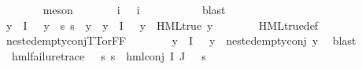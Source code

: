 \begin{isabellebody}
\ \ \ \ \ \ \isamarkupfalse%
\ meson\isanewline
\ \ \ \ \isamarkupfalse%
\ \isamarkupfalse%
\ i{\isacharunderscore}{\kern0pt}{\isasymphi}\ \ {\isachardoublequoteopen}{\isasymPhi}\ i{\isacharunderscore}{\kern0pt}{\isasymphi}\ {\isacharequal}{\kern0pt}\ {\isasymphi}{\isachardoublequoteclose}\ \isanewline
\ \ \ \ \ \ \isamarkupfalse%
\ blast\isanewline
\ \ \ \ \isamarkupfalse%
\ {\isachardoublequoteopen}{\isasymexists}y\ {\isasymin}\ {\isasymPhi}{\isacharbackquote}{\kern0pt}I{\isachardot}{\kern0pt}\ {\isasymphi}\ {\isasymnoteq}\ y\ {\isasymand}\ {\isacharparenleft}{\kern0pt}{\isasymforall}s{\isachardot}{\kern0pt}\ {\isasymnot}{\isacharparenleft}{\kern0pt}s\ {\isasymTurnstile}\ y{\isacharparenright}{\kern0pt}{\isacharparenright}{\kern0pt}{\isachardoublequoteclose}\ {\isacharbar}{\kern0pt}\ {\isachardoublequoteopen}{\isacharparenleft}{\kern0pt}{\isasymforall}y{\isasymin}{\isasymPhi}\ {\isacharbackquote}{\kern0pt}\ I{\isachardot}{\kern0pt}\ {\isasymphi}\ {\isasymnoteq}\ y\ {\isasymlongrightarrow}\ HML{\isacharunderscore}{\kern0pt}true\ y{\isacharparenright}{\kern0pt}{\isachardoublequoteclose}\isanewline
\ \ \ \ \ \ \isamarkupfalse%
\ HML{\isacharunderscore}{\kern0pt}true{\isacharunderscore}{\kern0pt}def\isanewline
\ \ \ \ \ \ \isamarkupfalse%
\ nested{\isacharunderscore}{\kern0pt}empty{\isacharunderscore}{\kern0pt}conj{\isacharunderscore}{\kern0pt}TT{\isacharunderscore}{\kern0pt}or{\isacharunderscore}{\kern0pt}FF\isanewline
\ \ \ \ \ \ \isamarkupfalse%
\ {\isacartoucheopen}{\isasymforall}y{\isasymin}{\isasymPhi}\ {\isacharbackquote}{\kern0pt}\ I{\isachardot}{\kern0pt}\ {\isasymphi}\ {\isasymnoteq}\ y\ {\isasymlongrightarrow}\ nested{\isacharunderscore}{\kern0pt}empty{\isacharunderscore}{\kern0pt}conj\ y{\isacartoucheclose}\ \isamarkupfalse%
\ blast\isanewline
\ \ \ \ \isamarkupfalse%
\ \isamarkupfalse%
\ {\isachardoublequoteopen}{\isasymexists}{\isasympsi}{\isachardot}{\kern0pt}\ hml{\isacharunderscore}{\kern0pt}failure{\isacharunderscore}{\kern0pt}trace\ {\isasympsi}\ {\isasymand}\ {\isacharparenleft}{\kern0pt}{\isasymforall}s{\isachardot}{\kern0pt}\ {\isacharparenleft}{\kern0pt}s\ {\isasymTurnstile}\ hml{\isacharunderscore}{\kern0pt}conj\ I\ J\ {\isasymPhi}{\isacharparenright}{\kern0pt}\ {\isacharequal}{\kern0pt}\ {\isacharparenleft}{\kern0pt}s\ {\isasymTurnstile}\ {\isasympsi}{\isacharparenright}{\kern0pt}{\isacharparenright}{\kern0pt}{\isachardoublequoteclose}\isanewline

\end{isabellebody}
